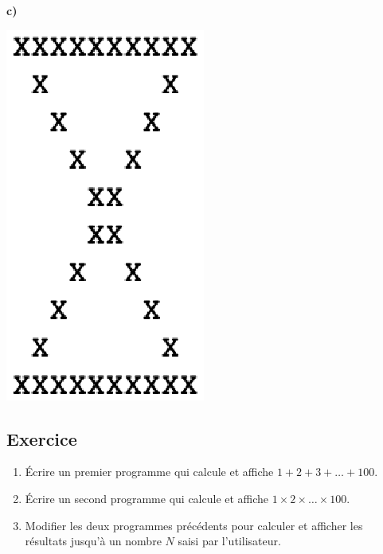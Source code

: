 \documentclass[11pt,a4paper]{article}
\newcounter{numexo}
\begin{document}
\begin{enumerate}
\begin{minipage}{6cm}
\begin{center}
\end{center}
\end{minipage}
\begin{minipage}{6cm}
\textbf{c)}
\begin{center}
\includegraphics[scale=0.5]{img/carreX6.eps}
\end{center}
\end{minipage}
\end{enumerate}

\addtocounter{numexo}{1}
\subsection*{\Large Exercice \thenumexo }
\begin{enumerate}
\item Écrire un premier programme qui calcule et affiche $1 + 2 + 3 + \ldots + 100$.
\item Écrire un second programme qui calcule et affiche $1 \times 2 \times \ldots \times 100$.
\item Modifier les deux programmes précédents pour calculer et afficher les résultats jusqu'à un nombre $N$ saisi par l'utilisateur.
\end{enumerate}

\addtocounter{numexo}{1}
\end{document}
